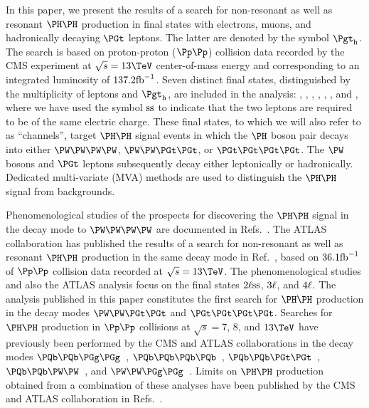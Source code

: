 In this paper, we present the results of a search for non-resonant as well as resonant $\HH$ production
in final states with electrons, muons, and hadronically decaying $\PGt$ leptons. The latter are denoted by the symbol $\tauh$.
The search is based on proton-proton ($\Pp\Pp$) collision data recorded by the CMS experiment at $\sqrt{s} = 13\TeV$ center-of-mass energy
and corresponding to an integrated luminosity of $137.2\fbinv$.
Seven distinct final states, distinguished by the multiplicity of leptons and $\tauh$, are included in the analysis:
\zeroLeptonFourTau, \oneLeptonThreeTau, \twoLeptonssZeroTau, \twoLeptonTwoTau, \threeLeptonZeroTau, \threeLeptonOneTau, and \fourLeptonZeroTau,
where we have used the symbol $\ss$ to indicate that the two leptons are required to be of the same electric charge. 
These final states, to which we will also refer to as ``channels'', 
target $\HH$ signal events in which the $\PHiggs$ boson pair decays into either $\PW\PW\PW\PW$, $\PW\PW\PGt\PGt$, or $\PGt\PGt\PGt\PGt$.
The $\PW$ bosons and $\PGt$ leptons subsequently decay either leptonically or hadronically.
Dedicated multi-variate (MVA) methods are used to distinguish the $\PHiggs\PHiggs$ signal from backgrounds.

Phenomenological studies of the prospects for discovering the $\HH$ signal in the decay mode to $\PW\PW\PW\PW$ 
are documented in Refs.~\cite{Baur:2002rb,Baur:2002qd,Li:2015yia,Adhikary:2017jtu,Ren:2017jbg}.
The ATLAS collaboration has published the results of a search for non-resonant as well as resonant $\HH$ production in the same decay mode in Ref.~\cite{Aaboud:2018ksn},
based on $36.1\fbinv$ of $\Pp\Pp$ collision data recorded at $\sqrt{s} = 13\TeV$.
The phenomenological studies and also the ATLAS analysis focus on the final states $2\Plepton\ss$, $3\Plepton$, and $4\Plepton$.
The analysis published in this paper constitutes the first search for $\HH$ production in the decay modes $\PW\PW\PGt\PGt$ and $\PGt\PGt\PGt\PGt$.
Searches for $\HH$ production in $\Pp\Pp$ collisions at $\sqrt{s} = 7$, $8$, and $13\TeV$
have previously been performed by the CMS and ATLAS collaborations in the decay modes 
$\Pbottom\Pbottom\PGg\PGg$~\cite{Aad:2014yja,Khachatryan:2016sey,Sirunyan:2018iwt,Aaboud:2018ftw}, 
$\Pbottom\Pbottom\Pbottom\Pbottom$~\cite{Khachatryan:2015yea,Aad:2015uka,Aaboud:2018knk,Sirunyan:2018zkk,Sirunyan:2018tki}, 
$\Pbottom\Pbottom\PGt\PGt$~\cite{Aad:2015xja,Sirunyan:2017tqo,Sirunyan:2017djm,Aaboud:2018sfw}, 
$\Pbottom\Pbottom\PW\PW$~\cite{Sirunyan:2017guj}, 
and $\PW\PW\PGg\PGg$~\cite{Aaboud:2018ewm}.
Limits on $\HH$ production obtained from a combination of these analyses have been published by the CMS and ATLAS collaboration 
in Refs.~\cite{Aad:2015xja,Sirunyan:2017tqo,Sirunyan:2018ayu}.

